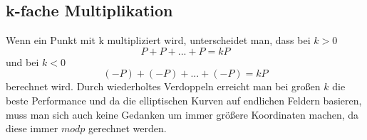 \subsection{k-fache Multiplikation}
Wenn ein Punkt mit k multipliziert wird, unterscheidet man, dass bei \(k > 0\) \[P + P + ... + P = kP\] und bei \(k < 0\) \[ (-P) + (-P) + ... + (-P) = kP\] berechnet wird. Durch wiederholtes Verdoppeln erreicht man bei großen \(k\) die beste Performance und da die elliptischen Kurven auf endlichen Feldern basieren, muss man sich auch keine Gedanken um immer größere Koordinaten machen, da diese immer \( mod p\) gerechnet werden.